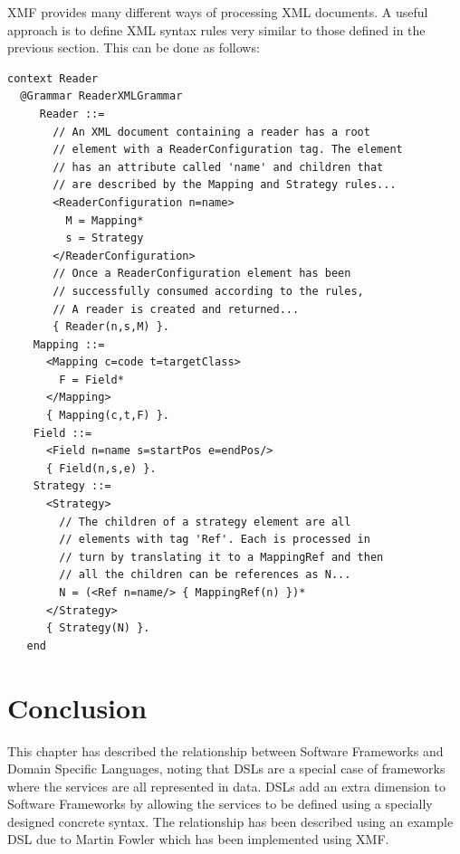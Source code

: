 XMF provides many different ways of processing XML documents. A useful 
approach is to define XML syntax rules very similar to those defined 
in the previous section. This can be done as follows:
\begin{lstlisting}
context Reader
  @Grammar ReaderXMLGrammar
     Reader ::=
       // An XML document containing a reader has a root
       // element with a ReaderConfiguration tag. The element
       // has an attribute called 'name' and children that
       // are described by the Mapping and Strategy rules...
       <ReaderConfiguration n=name>
         M = Mapping*
         s = Strategy
       </ReaderConfiguration>
       // Once a ReaderConfiguration element has been
       // successfully consumed according to the rules,
       // A reader is created and returned...
       { Reader(n,s,M) }.
    Mapping ::=
      <Mapping c=code t=targetClass>    
        F = Field*
      </Mapping>
      { Mapping(c,t,F) }.
    Field ::=
      <Field n=name s=startPos e=endPos/>
      { Field(n,s,e) }.
    Strategy ::=
      <Strategy>
        // The children of a strategy element are all
        // elements with tag 'Ref'. Each is processed in
        // turn by translating it to a MappingRef and then
        // all the children can be references as N...
        N = (<Ref n=name/> { MappingRef(n) })*
      </Strategy>
      { Strategy(N) }.
   end
\end{lstlisting}

\section{Conclusion}

This chapter has described the relationship between Software 
Frameworks and Domain Specific Languages, noting that DSLs are 
a special case of frameworks where the services are all represented 
in data. DSLs add an extra dimension to Software Frameworks by 
allowing the services to be defined using a specially designed 
concrete syntax. The relationship has been described using an 
example DSL due to Martin Fowler which has been implemented using 
XMF.
